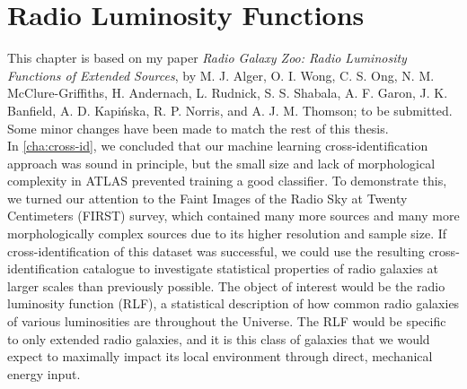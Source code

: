 \chapter{Radio Luminosity Functions}
\label{cha:rlfs}





This chapter is based on my paper \emph{Radio Galaxy Zoo: Radio Luminosity Functions of Extended Sources}, by M. J. Alger, O. I. Wong, C. S. Ong, N. M. McClure-Griffiths, H. Andernach, L. Rudnick, S. S. Shabala, A. F. Garon, J. K. Banfield, A. D. Kapi\'nska, R. P. Norris, and A. J. M. Thomson; to be submitted. Some minor changes have been made to match the rest of this thesis.\\

In \autoref{cha:cross-id}, we concluded that our machine learning cross-identification approach was sound in principle, but the small size and lack of morphological complexity in ATLAS prevented training a good classifier. To demonstrate this, we turned our attention to the Faint Images of the Radio Sky at Twenty Centimeters (FIRST) survey, which contained many more sources and many more morphologically complex sources due to its higher resolution and sample size. If cross-identification of this dataset was successful, we could use the resulting cross-identification catalogue to investigate statistical properties of radio galaxies at larger scales than previously possible. The object of interest would be the radio luminosity function (RLF), a statistical description of how common radio galaxies of various luminosities are throughout the Universe. The RLF would be specific to only extended radio galaxies, and it is this class of galaxies that we would expect to maximally impact its local environment through direct, mechanical energy input.

